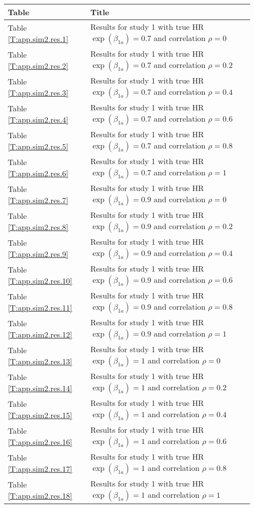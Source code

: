 \begingroup\small
\begin{tabular}{ll}
  \hline
\hline
Table & Title \\ 
  \hline
Table \ref{T:app.sim2.res.1} & Results for study 1 with true HR $\exp(\beta_{1a}) =0.7$ and correlation $\rho =0$ \\ 
  Table \ref{T:app.sim2.res.2} & Results for study 1 with true HR $\exp(\beta_{1a}) =0.7$ and correlation $\rho =0.2$ \\ 
  Table \ref{T:app.sim2.res.3} & Results for study 1 with true HR $\exp(\beta_{1a}) =0.7$ and correlation $\rho =0.4$ \\ 
  Table \ref{T:app.sim2.res.4} & Results for study 1 with true HR $\exp(\beta_{1a}) =0.7$ and correlation $\rho =0.6$ \\ 
  Table \ref{T:app.sim2.res.5} & Results for study 1 with true HR $\exp(\beta_{1a}) =0.7$ and correlation $\rho =0.8$ \\ 
  Table \ref{T:app.sim2.res.6} & Results for study 1 with true HR $\exp(\beta_{1a}) =0.7$ and correlation $\rho =1$ \\ 
   \hline
Table \ref{T:app.sim2.res.7} & Results for study 1 with true HR $\exp(\beta_{1a}) =0.9$ and correlation $\rho =0$ \\ 
  Table \ref{T:app.sim2.res.8} & Results for study 1 with true HR $\exp(\beta_{1a}) =0.9$ and correlation $\rho =0.2$ \\ 
  Table \ref{T:app.sim2.res.9} & Results for study 1 with true HR $\exp(\beta_{1a}) =0.9$ and correlation $\rho =0.4$ \\ 
  Table \ref{T:app.sim2.res.10} & Results for study 1 with true HR $\exp(\beta_{1a}) =0.9$ and correlation $\rho =0.6$ \\ 
  Table \ref{T:app.sim2.res.11} & Results for study 1 with true HR $\exp(\beta_{1a}) =0.9$ and correlation $\rho =0.8$ \\ 
  Table \ref{T:app.sim2.res.12} & Results for study 1 with true HR $\exp(\beta_{1a}) =0.9$ and correlation $\rho =1$ \\ 
   \hline
Table \ref{T:app.sim2.res.13} & Results for study 1 with true HR $\exp(\beta_{1a}) =1$ and correlation $\rho =0$ \\ 
  Table \ref{T:app.sim2.res.14} & Results for study 1 with true HR $\exp(\beta_{1a}) =1$ and correlation $\rho =0.2$ \\ 
  Table \ref{T:app.sim2.res.15} & Results for study 1 with true HR $\exp(\beta_{1a}) =1$ and correlation $\rho =0.4$ \\ 
  Table \ref{T:app.sim2.res.16} & Results for study 1 with true HR $\exp(\beta_{1a}) =1$ and correlation $\rho =0.6$ \\ 
  Table \ref{T:app.sim2.res.17} & Results for study 1 with true HR $\exp(\beta_{1a}) =1$ and correlation $\rho =0.8$ \\ 
  Table \ref{T:app.sim2.res.18} & Results for study 1 with true HR $\exp(\beta_{1a}) =1$ and correlation $\rho =1$ \\ 
   \hline
\end{tabular}
\endgroup
